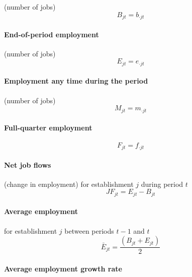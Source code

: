 (number of jobs)%
\begin{equation}
B_{jt}=b_{\cdot jt}
\end{equation}

\paragraph{End-of-period employment}

(number of jobs)%
\begin{equation}
E_{jt}=e_{\cdot jt}
\end{equation}

\paragraph{Employment any time during the period}

(number of jobs) 
\begin{equation}
M_{jt}=m_{\cdot jt}
\end{equation}

\paragraph{Full-quarter employment}

\begin{equation}
F_{jt}=f_{\cdot jt}
\end{equation}

\paragraph{Net job flows}

(change in employment) for establishment $j$ during period $t$%
\begin{equation}
JF_{jt}=E_{jt}-B_{jt}  \label{eq:JFjt}
\end{equation}

\paragraph{Average employment}

for establishment $j$ between periods $t-1$ and $t$%
\begin{equation}
\bar{E}_{jt}=\frac{\left( B_{jt}+E_{jt}\right) }{2}  \label{eq:ebarjt}
\end{equation}

\paragraph{Average employment growth rate}

